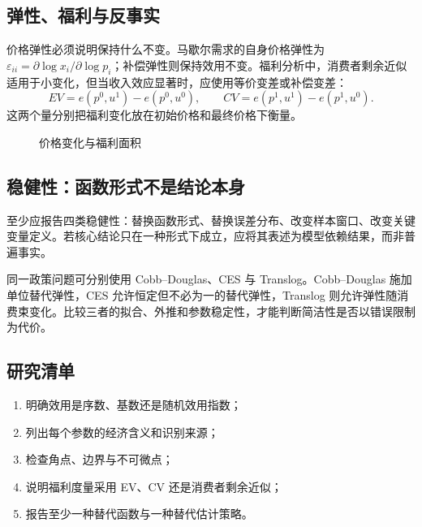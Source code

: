 \subsection{弹性、福利与反事实}
价格弹性必须说明保持什么不变。马歇尔需求的自身价格弹性为
$\varepsilon_{ii}=\partial\log x_i/\partial\log p_i$；补偿弹性则保持效用不变。福利分析中，消费者剩余近似适用于小变化，但当收入效应显著时，应使用等价变差或补偿变差：
\[
EV=e(p^0,u^1)-e(p^0,u^0),\qquad
CV=e(p^1,u^1)-e(p^1,u^0).
\]
这两个量分别把福利变化放在初始价格和最终价格下衡量。

\begin{figure}[H]\centering
{}
\caption{价格变化与福利面积}
\end{figure}

\subsection{稳健性：函数形式不是结论本身}
至少应报告四类稳健性：替换函数形式、替换误差分布、改变样本窗口、改变关键变量定义。若核心结论只在一种形式下成立，应将其表述为模型依赖结果，而非普遍事实。

\begin{example}[三种函数形式的比较]
同一政策问题可分别使用 Cobb--Douglas、CES 与 Translog。Cobb--Douglas 施加单位替代弹性，CES 允许恒定但不必为一的替代弹性，Translog 则允许弹性随消费束变化。比较三者的拟合、外推和参数稳定性，才能判断简洁性是否以错误限制为代价。
\end{example}

\subsection{研究清单}
\begin{enumerate}
\item 明确效用是序数、基数还是随机效用指数；
\item 列出每个参数的经济含义和识别来源；
\item 检查角点、边界与不可微点；
\item 说明福利度量采用 EV、CV 还是消费者剩余近似；
\item 报告至少一种替代函数与一种替代估计策略。
\end{enumerate}
